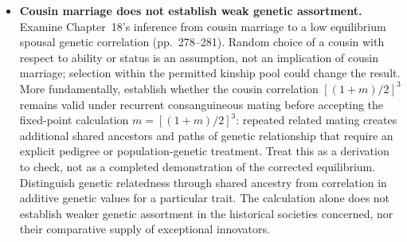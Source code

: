 \begin{itemize}
\item \textbf{Cousin marriage does not establish weak genetic assortment.}
Examine Chapter~18's inference from cousin marriage to a low equilibrium
spousal genetic correlation (pp.~278--281). Random choice of a cousin
with respect to ability or status is an assumption, not an implication
of cousin marriage; selection within the permitted kinship pool could
change the result. More fundamentally, establish whether the cousin
correlation $[(1+m)/2]^3$ remains valid under recurrent consanguineous
mating before accepting the fixed-point calculation
$m=[(1+m)/2]^3$: repeated related mating creates additional shared
ancestors and paths of genetic relationship that require an explicit
pedigree or population-genetic treatment. Treat this as a derivation to
check, not as a completed demonstration of the corrected equilibrium.
Distinguish genetic relatedness through shared ancestry from correlation
in additive genetic values for a particular trait. The calculation alone
does not establish weaker genetic assortment in the historical societies
concerned, nor their comparative supply of exceptional innovators.

\end{itemize}
